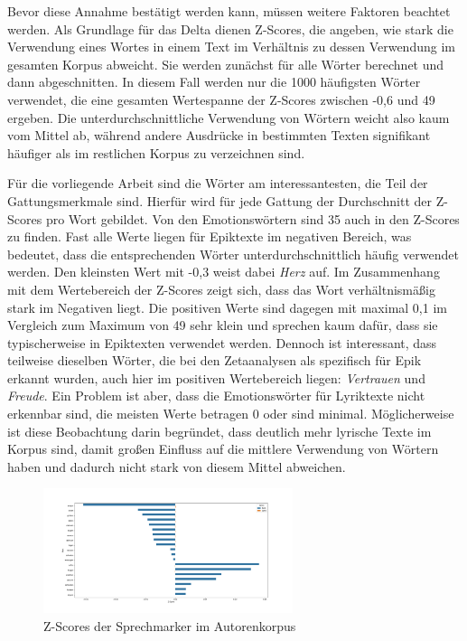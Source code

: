 \documentclass[a4paper,10p]{article}
\begin{document}
Bevor diese Annahme bestätigt werden kann, müssen weitere Faktoren beachtet werden. Als Grundlage für das Delta dienen Z-Scores, die angeben, wie stark die Verwendung eines Wortes in einem Text im Verhältnis zu dessen Verwendung im gesamten Korpus abweicht. Sie werden zunächst für alle Wörter berechnet und dann abgeschnitten. In diesem Fall werden nur die 1000 häufigsten Wörter verwendet, die eine gesamten Wertespanne der Z-Scores zwischen -0,6 und 49 ergeben. Die unterdurchschnittliche Verwendung von Wörtern weicht also kaum vom Mittel ab, während andere Ausdrücke in bestimmten Texten signifikant häufiger als im restlichen Korpus zu verzeichnen sind. \par 

Für die vorliegende Arbeit sind die Wörter am interessantesten, die Teil der Gattungsmerkmale sind. Hierfür wird für jede Gattung der Durchschnitt der Z-Scores pro Wort gebildet. Von den Emotionswörtern sind 35 auch in den Z-Scores zu finden. Fast alle Werte liegen für Epiktexte im negativen Bereich, was bedeutet, dass die entsprechenden Wörter unterdurchschnittlich häufig verwendet werden. Den kleinsten Wert mit -0,3 weist dabei \textit{Herz} auf. Im Zusammenhang mit dem Wertebereich der Z-Scores zeigt sich, dass das Wort verhältnismäßig stark im Negativen liegt. Die positiven Werte sind dagegen mit maximal 0,1 im Vergleich zum Maximum von 49 sehr klein und sprechen kaum dafür, dass sie typischerweise in Epiktexten verwendet werden. Dennoch ist interessant, dass teilweise dieselben Wörter, die bei den Zetaanalysen als spezifisch für Epik erkannt wurden, auch hier im positiven Wertebereich liegen: \textit{Vertrauen} und \textit{Freude}. Ein Problem ist aber, dass die Emotionswörter für Lyriktexte nicht erkennbar sind, die meisten Werte betragen 0 oder sind minimal. Möglicherweise ist diese Beobachtung darin begründet, dass deutlich mehr lyrische Texte im Korpus sind, damit großen Einfluss auf die mittlere Verwendung von Wörtern haben und dadurch nicht stark von diesem Mittel abweichen. \par 

\begin{figure}
	\includegraphics[width=0.65\textwidth]{autoren_sprechmarker_zscores.png}
	\caption{Z-Scores der Sprechmarker im Autorenkorpus}
	\label{fig:zscore_emo}
\end{figure}
\end{document}
